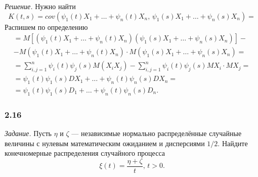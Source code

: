 \textit{Решение.}
Нужно найти
$$K \left( t, s \right) =
  cov \left( \psi_1 \left( t \right) X_1 + \dotsc + \psi_n \left( t \right) X_n, \,
    \psi_1 \left( s \right) X_1 + \dotsc + \psi_n \left( s \right) X_n \right) =$$
Распишем по определению
\begin{equation*}
  \begin{split}
    = M \left[
      \left( \psi_1 \left( t \right) X_1 + \dotsc + \psi_n \left( t \right) X_n \right)
      \left( \psi_1 \left( s \right) X_1 + \dotsc + \psi_n \left( s \right) X_n \right) \right] - \\
    - M \left( \psi_1 \left( t \right) X_1 + \dotsc + \psi_n \left( t \right) X_n \right) \cdot
    M \left( \psi_1 \left( s \right) X_1 + \dotsc + \psi_n \left( s \right) X_n \right) = \\
    = \sum \limits_{i, j = 1}^n
      \psi_i \left( t \right) \psi_j \left( s \right) M \left( X_i X_j \right) -
    \sum \limits_{i, j = 1}^n \psi_i \left( t \right) \psi_j \left( s \right) MX_i \cdot MX_j = \\
    = \psi_1 \left( t \right) \psi_1 \left( s \right) DX_1 + \dotsc +
    \psi_n \left( t \right) \psi_n \left( s \right) DX_n= \\
    = \psi_1 \left( t \right) \psi_1 \left( s \right) D_1 + \dotsc +
    \psi_n \left( t \right) \psi_n \left( s \right) D_n.
  \end{split}
\end{equation*}

\subsubsection*{2.16}

\textit{Задание.}
Пусть $ \eta $ и $ \zeta $ --- независимые нормально распределённые
случайные величины с нулевым математическим ожиданием и дисперсиями $1 / 2$.
Найдите конечномерные распределения случайного процесса
$$ \xi \left( t \right) =
  \frac{ \eta + \zeta }{t}, \,
  t > 0.$$

